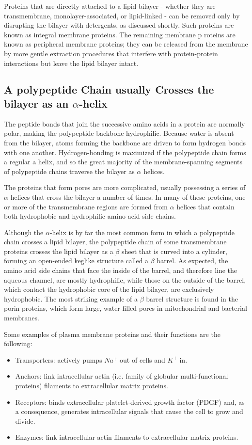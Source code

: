 Proteins that are directly attached to a lipid bilayer - whether they are
transmembrane, monolayer-associated, or lipid-linked - can be removed
only by disrupting the bilayer with detergents, as discussed shortly. Such
proteins are known as integral membrane proteins. The remaining membrane p
roteins are known as peripheral membrane proteins; they can
be released from the membrane by more gentle extraction procedures
that interfere with protein-protein interactions but leave the lipid bilayer
intact.

\subsection{A polypeptide Chain usually Crosses the bilayer as an $\alpha$-helix}

The peptide bonds that join the successive amino acids in a protein are normally polar, making
the polypeptide backbone hydrophilic. Because water is
absent from the bilayer, atoms forming the backbone are driven to form
hydrogen bonds with one another. Hydrogen-bonding is maximized if the
polypeptide chain forms a regular a helix, and so the great majority of the
membrane-spanning segments of polypeptide chains traverse the bilayer
as $\alpha$ helices.

The proteins that form pores are more complicated, usually possessing a
series of $\alpha$ helices that cross the bilayer a number of times. In many of these proteins,
one or more of the transmembrane regions are formed from $\alpha$ helices
that contain both hydrophobic and hydrophilic amino acid side chains.

Although the $\alpha$-helix is by far the most common form in which a polypeptide
chain crosses a lipid bilayer, the polypeptide chain of some transmembrane
proteins crosses the lipid bilayer as a $\beta$ sheet that is curved into a
cylinder, forming an open-ended keglike structure called a $\beta$ barrel. As
expected, the amino acid side chains that face the inside of the barrel, and
therefore line the aqueous channel, are mostly hydrophilic, while those
on the outside of the barrel, which contact the hydrophobic core of the
lipid bilayer, are exclusively hydrophobic. The most striking example of a
$\beta$ barrel structure is found in the porin proteins, which form large, water-filled
pores in mitochondrial and bacterial membranes.

Some examples of plasma membrane proteins and their functions are the following:

\begin{itemize}
\item Transporters: actively pumps $Na^{+}$ out of cells and $K^{+}$ in.
\item Anchors: link intracellular actin (i.e. family of globular multi-functional proteins) filaments to extracellular matrix proteins.
\item Receptors: binds extracellular platelet-derived growth factor (PDGF) and, as a consequence, generates intracellular signals
that cause the cell to grow and divide.
\item Enzymes: link intracellular actin filaments to extracellular matrix proteins.
\end{itemize}

